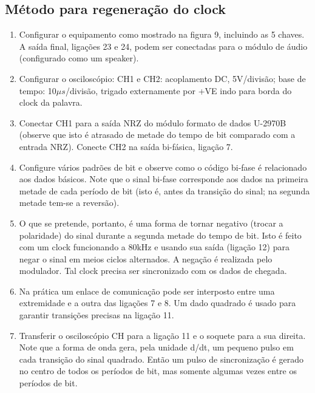         \subsection{Método para regeneração do clock}
            \begin{enumerate}
                \item Configurar o equipamento como mostrado na figura 9, incluindo as 5 chaves. A saída final,
                ligações 23 e 24, podem ser conectadas para o módulo de áudio (configurado como um
                speaker).
                
                \item Configurar o osciloscópio: CH1 e CH2: acoplamento DC, 5V/divisão; base de tempo:
                10$\mu s$/divisão, trigado externamente por +VE indo para borda do clock da palavra.
                
                \item Conectar CH1 para a saída NRZ do módulo formato de dados U-2970B (observe que isto é
                atrasado de metade do tempo de bit comparado com a entrada NRZ). Conecte CH2 na saída
                bi-fásica, ligação 7.
                
                \item Configure vários padrões de bit e observe como o código bi-fase é relacionado aos dados
                básicos. Note que o sinal bi-fase corresponde aos dados na primeira metade de cada período
                de bit (isto é, antes da transição do sinal; na segunda metade tem-se a reversão).
                
                \item O que se pretende, portanto, é uma forma de tornar negativo (trocar a polaridade) do sinal
                durante a segunda metade do tempo de bit. Isto é feito com um clock funcionando a 80kHz
                e usando sua saída (ligação 12) para negar o sinal em meios ciclos alternados. A negação é
                realizada pelo modulador. Tal clock precisa ser sincronizado com os dados de chegada.
                
                \item Na prática um enlace de comunicação pode ser interposto entre uma extremidade e a outra
                das ligações 7 e 8. Um dado quadrado é usado para garantir transições precisas na ligação
                11.
                
                \item Transferir o osciloscópio CH para a ligação 11 e o soquete para a sua direita. Note que
                a forma de onda gera, pela unidade d/dt, um pequeno pulso em cada transição do sinal
                quadrado. Então um pulso de sincronização é gerado no centro de todos os períodos de bit,
                mas somente algumas vezes entre os períodos de bit.
            \end{enumerate}
            
